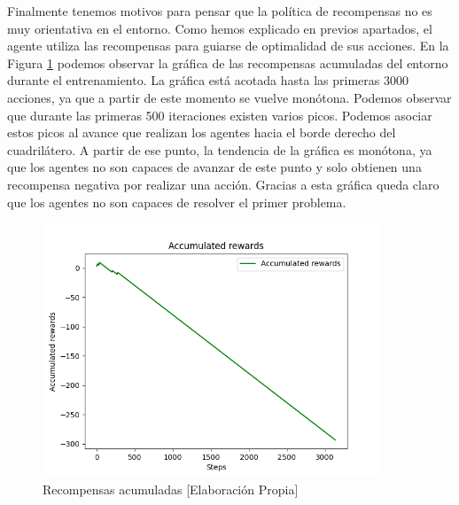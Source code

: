 Finalmente tenemos motivos para pensar que la política de recompensas no es muy orientativa en el entorno. Como hemos explicado en previos apartados, el agente utiliza las recompensas para guiarse de optimalidad de sus acciones. En la Figura \ref {fig:cum} podemos observar la gráfica de las recompensas acumuladas del entorno durante el entrenamiento. La gráfica está acotada hasta las primeras 3000 acciones, ya que a partir de este momento se vuelve monótona. Podemos observar que durante las primeras 500 iteraciones existen varios picos. Podemos asociar estos picos al avance que realizan los agentes hacia el borde derecho del cuadrilátero. A partir de ese punto, la tendencia de la gráfica es monótona, ya que los agentes no son capaces de avanzar de este punto y solo obtienen una recompensa negativa por realizar una acción. Gracias a esta gráfica queda claro que los agentes no son capaces de resolver el primer problema.
\begin{figure}[ht]
    \centering
    \includegraphics[width=0.9\textwidth]{img/rewards_cum.png}
    \caption{Recompensas acumuladas [Elaboración Propia]}
    \label{fig:cum}
\end{figure}


